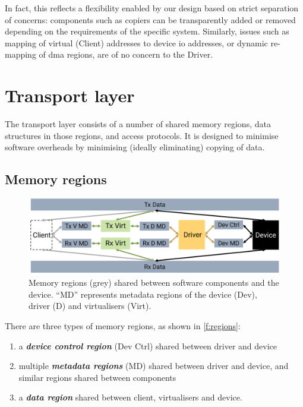 \documentclass[a4paper,12pt]{report}
\newcommand{\Obj}[1]{\textsl{#1}}
\newcommand{\figscale}{0.2}
\begin{document}
In fact, this reflects a flexibility enabled by our design based on
strict separation of concerns: components such as copiers can
be transparently added or removed depending on the requirements of the
specific system. Similarly, issues such as mapping of virtual (Client)
addresses to device \gls{io} addresses, or dynamic re-mapping of \gls{dma} regions,
are of no concern to the Driver.

\section{Transport layer}\label{s:transport}

The transport layer consists of a number of shared memory regions,
data structures in those regions, and access protocols. It is designed
to minimise software overheads by minimising (ideally eliminating)
copying of data.

\subsection{Memory regions}\label{s:regs}

\begin{figure}[th]
  \centering
  \includegraphics[scale=\figscale]{regions}
  \caption[Memory regions shared between software components
    and the device.]{Memory regions (grey) shared between software components
    and the device. ``MD'' represents metadata regions of the device
    (Dev), driver (D) and virtualisers (Virt).}
  \label{f:regions}
\end{figure}

There are three types of memory
regions, as shown in \autoref{f:regions}:
\begin{enumerate}
\item a \textbf{\Obj{device control region}} (Dev Ctrl) shared between driver and device
\item multiple \textbf{\Obj{metadata regions}} (MD) shared between driver and
  device, and similar regions shared between components
\item a \textbf{\Obj{data region}} shared between client, virtualisers and device.
\end{enumerate}
\end{document}

